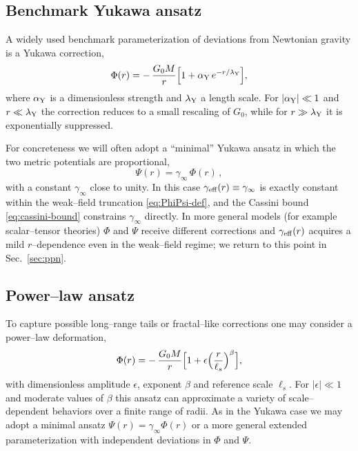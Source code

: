 \documentclass[11pt,a4paper]{article}
\begin{document}
\subsection{Benchmark Yukawa ansatz}

A widely used benchmark parameterization of deviations from Newtonian gravity is a Yukawa correction,
\begin{equation}
\Phi(r) = -\,\frac{G_0 M}{r}\Bigl[1 + \alpha_{\rm Y}\,e^{-r/\lambda_{\rm Y}}\Bigr],
\label{eq:yukawa-Phi}
\end{equation}
where $\alpha_{\rm Y}$ is a dimensionless strength and $\lambda_{\rm Y}$ a length scale. For $|\alpha_{\rm Y}|\ll 1$ and $r\ll \lambda_{\rm Y}$ the correction reduces to a small rescaling of $G_0$, while for $r\gg\lambda_{\rm Y}$ it is exponentially suppressed.

For concreteness we will often adopt a ``minimal'' Yukawa ansatz in which the two metric potentials are proportional,
\begin{equation}
\Psi(r) = \gamma_\infty\,\Phi(r)\,,
\label{eq:minimal-ansatz}
\end{equation}
with a constant $\gamma_\infty$ close to unity. In this case $\gamma_{\rm eff}(r)\equiv\gamma_\infty$ is exactly constant within the weak--field truncation \eqref{eq:PhiPsi-def}, and the Cassini bound \eqref{eq:cassini-bound} constrains $\gamma_\infty$ directly. In more general models (for example scalar--tensor theories) $\Phi$ and $\Psi$ receive different corrections and $\gamma_{\rm eff}(r)$ acquires a mild $r$--dependence even in the weak--field regime; we return to this point in Sec.~\ref{sec:ppn}.

\subsection{Power--law ansatz}

To capture possible long--range tails or fractal--like corrections one may consider a power--law deformation,
\begin{equation}
\Phi(r) = -\,\frac{G_0 M}{r}\Bigl[1 + \epsilon\Bigl(\frac{r}{\ell_s}\Bigr)^\beta\Bigr],
\label{eq:powerlaw-Phi}
\end{equation}
with dimensionless amplitude $\epsilon$, exponent $\beta$ and reference scale $\ell_s$. For $|\epsilon|\ll 1$ and moderate values of $\beta$ this ansatz can approximate a variety of scale--dependent behaviors over a finite range of radii. As in the Yukawa case we may adopt a minimal ansatz $\Psi(r)=\gamma_\infty\Phi(r)$ or a more general extended parameterization with independent deviations in $\Phi$ and $\Psi$.
\end{document}
